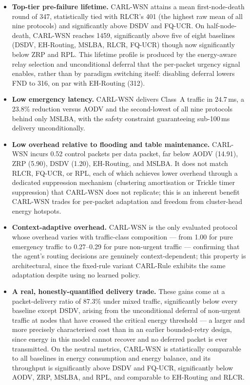 \documentclass[12pt]{article}
\begin{document}
\begin{itemize}
\item \textbf{Top-tier pre-failure lifetime.} CARL-WSN attains a
mean first-node-death round of 347, statistically tied with RLCR's
401 (the highest raw mean of all nine protocols) and significantly
above DSDV and FQ-UCR. On half-node-death, CARL-WSN reaches 1459,
significantly above five of eight baselines (DSDV, EH-Routing,
MSLBA, RLCR, FQ-UCR) though now significantly below ZRP and RPL.
This lifetime profile is produced by the energy-aware relay
selection and unconditional deferral that the per-packet urgency
signal enables, rather than by paradigm switching itself: disabling
deferral lowers FND to 316, on par with EH-Routing (312).

\item \textbf{Low emergency latency.} CARL-WSN delivers Class~A
traffic in 24.7\,ms, a 23.8\% reduction versus AODV and the
second-lowest of all nine protocols behind only MSLBA, with the
safety constraint guaranteeing sub-100\,ms delivery unconditionally.

\item \textbf{Low overhead relative to flooding and table
maintenance.} CARL-WSN incurs 0.52 control packets per data packet,
far below AODV (14.91), ZRP (5.90), DSDV (1.20), EH-Routing, and
MSLBA. It does not match RLCR, FQ-UCR, or RPL, each of which
achieves lower overhead through a dedicated suppression mechanism
(clustering amortisation or Trickle timer suppression) that CARL-WSN
does not replicate; this is an inherent benefit CARL-WSN trades for
per-packet adaptation and freedom from cluster-head energy hotspots.

\item \textbf{Context-adaptive overhead.} CARL-WSN is the only
evaluated protocol whose overhead varies with traffic-class
composition --- from 1.00 for pure emergency traffic to 0.27--0.29
for pure non-urgent traffic --- confirming that the agent's routing
decisions are genuinely context-dependent; this property is
architectural, since the fixed-rule variant CARL-Rule exhibits the
same adaptation despite using no learned policy.

\item \textbf{A real, honestly-quantified delivery trade.} These
gains come at a packet-delivery ratio of 87.3\% under mixed traffic,
significantly below every baseline except DSDV, arising from the
unconditional deferral of non-urgent traffic at nodes that have
crossed the critical energy threshold --- a larger and more
precisely characterised cost than in an earlier bounded-retry
design, since energy in this model cannot recover and no deferred
packet is ever transmitted. On the neutral metrics, CARL-WSN is
statistically comparable to all baselines in energy consumption and
energy balance, and its throughput is significantly above DSDV and
FQ-UCR, significantly below AODV, ZRP, MSLBA, and RPL, and
comparable to EH-Routing and RLCR.
\end{itemize}
\end{document}
